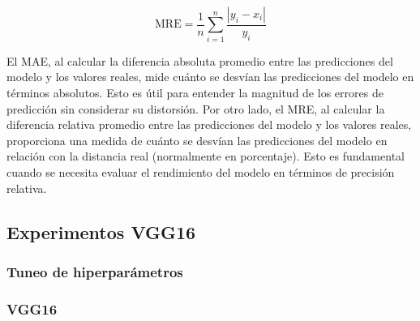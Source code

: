 \begin{equation}
	\text{MRE} = \frac{1}{n} \sum_{i=1}^{n} \frac{| y_i - x_i |}{y_i}
\end{equation}

El MAE, al calcular la diferencia absoluta promedio entre las predicciones del modelo y los valores reales, mide cuánto se desvían las predicciones del modelo en términos absolutos. Esto es útil para entender la magnitud de los errores de predicción sin considerar su distorsión.
Por otro lado, el MRE, al calcular la diferencia relativa promedio entre las predicciones del modelo y los valores reales, proporciona una medida de cuánto se desvían las predicciones del modelo en relación con la distancia real (normalmente en porcentaje). Esto es fundamental cuando se necesita evaluar el rendimiento del modelo en términos de precisión relativa.


\subsection{Experimentos VGG16}

\subsubsection{Tuneo de hiperparámetros}

\subsubsection{VGG16}

